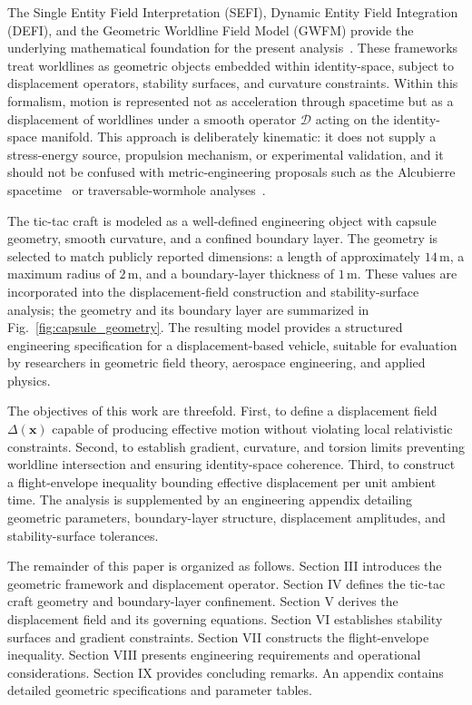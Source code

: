 \documentclass[aip,adv,reprint,floatfix]{revtex4-2}
\begin{document}
The Single Entity Field Interpretation (SEFI), Dynamic Entity Field Integration (DEFI), and the Geometric Worldline Field Model (GWFM) provide the underlying mathematical foundation for the present analysis~\cite{DuttonSEFI2026,DuttonGWFM2026,DuttonUnified2026,DuttonDEFI2026}. These frameworks treat worldlines as geometric objects embedded within identity-space, subject to displacement operators, stability surfaces, and curvature constraints. Within this formalism, motion is represented not as acceleration through spacetime but as a displacement of worldlines under a smooth operator $\mathcal{D}$ acting on the identity-space manifold. This approach is deliberately kinematic: it does not supply a stress-energy source, propulsion mechanism, or experimental validation, and it should not be confused with metric-engineering proposals such as the Alcubierre spacetime~\cite{Alcubierre1994} or traversable-wormhole analyses~\cite{MorrisThorne1988}.

The tic-tac craft is modeled as a well-defined engineering object with capsule geometry, smooth curvature, and a confined boundary layer. The geometry is selected to match publicly reported dimensions: a length of approximately $14\,\mathrm{m}$, a maximum radius of $2\,\mathrm{m}$, and a boundary-layer thickness of $1\,\mathrm{m}$. These values are incorporated into the displacement-field construction and stability-surface analysis; the geometry and its boundary layer are summarized in Fig.~\ref{fig:capsule_geometry}. The resulting model provides a structured engineering specification for a displacement-based vehicle, suitable for evaluation by researchers in geometric field theory, aerospace engineering, and applied physics.

The objectives of this work are threefold. First, to define a displacement field $\Delta(\mathbf{x})$ capable of producing effective motion without violating local relativistic constraints. Second, to establish gradient, curvature, and torsion limits preventing worldline intersection and ensuring identity-space coherence. Third, to construct a flight-envelope inequality bounding effective displacement per unit ambient time. The analysis is supplemented by an engineering appendix detailing geometric parameters, boundary-layer structure, displacement amplitudes, and stability-surface tolerances.

The remainder of this paper is organized as follows. Section III introduces the geometric framework and displacement operator. Section IV defines the tic-tac craft geometry and boundary-layer confinement. Section V derives the displacement field and its governing equations. Section VI establishes stability surfaces and gradient constraints. Section VII constructs the flight-envelope inequality. Section VIII presents engineering requirements and operational considerations. Section IX provides concluding remarks. An appendix contains detailed geometric specifications and parameter tables.
\end{document}
